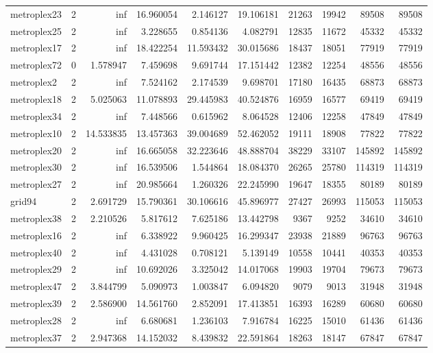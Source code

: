 \begin{longtable}{|l|r|r|r|r|r|r|r|r|r|}
metroplex23 & 2 & inf & 16.960054 & 2.146127 & 19.106181 & 21263 & 19942 & 89508 & 89508 \\
metroplex25 & 2 & inf & 3.228655 & 0.854136 & 4.082791 & 12835 & 11672 & 45332 & 45332 \\
metroplex17 & 2 & inf & 18.422254 & 11.593432 & 30.015686 & 18437 & 18051 & 77919 & 77919 \\
metroplex72 & 0 & 1.578947 & 7.459698 & 9.691744 & 17.151442 & 12382 & 12254 & 48556 & 48556 \\
metroplex2 & 2 & inf & 7.524162 & 2.174539 & 9.698701 & 17180 & 16435 & 68873 & 68873 \\
metroplex18 & 2 & 5.025063 & 11.078893 & 29.445983 & 40.524876 & 16959 & 16577 & 69419 & 69419 \\
metroplex34 & 2 & inf & 7.448566 & 0.615962 & 8.064528 & 12406 & 12258 & 47849 & 47849 \\
metroplex10 & 2 & 14.533835 & 13.457363 & 39.004689 & 52.462052 & 19111 & 18908 & 77822 & 77822 \\
metroplex20 & 2 & inf & 16.665058 & 32.223646 & 48.888704 & 38229 & 33107 & 145892 & 145892 \\
metroplex30 & 2 & inf & 16.539506 & 1.544864 & 18.084370 & 26265 & 25780 & 114319 & 114319 \\
metroplex27 & 2 & inf & 20.985664 & 1.260326 & 22.245990 & 19647 & 18355 & 80189 & 80189 \\
grid94 & 2 & 2.691729 & 15.790361 & 30.106616 & 45.896977 & 27427 & 26993 & 115053 & 115053 \\
metroplex38 & 2 & 2.210526 & 5.817612 & 7.625186 & 13.442798 & 9367 & 9252 & 34610 & 34610 \\
metroplex16 & 2 & inf & 6.338922 & 9.960425 & 16.299347 & 23938 & 21889 & 96763 & 96763 \\
metroplex40 & 2 & inf & 4.431028 & 0.708121 & 5.139149 & 10558 & 10441 & 40353 & 40353 \\
metroplex29 & 2 & inf & 10.692026 & 3.325042 & 14.017068 & 19903 & 19704 & 79673 & 79673 \\
metroplex47 & 2 & 3.844799 & 5.090973 & 1.003847 & 6.094820 & 9079 & 9013 & 31948 & 31948 \\
metroplex39 & 2 & 2.586900 & 14.561760 & 2.852091 & 17.413851 & 16393 & 16289 & 60680 & 60680 \\
metroplex28 & 2 & inf & 6.680681 & 1.236103 & 7.916784 & 16225 & 15010 & 61436 & 61436 \\
metroplex37 & 2 & 2.947368 & 14.152032 & 8.439832 & 22.591864 & 18263 & 18147 & 67847 & 67847 \\

\end{longtable}
